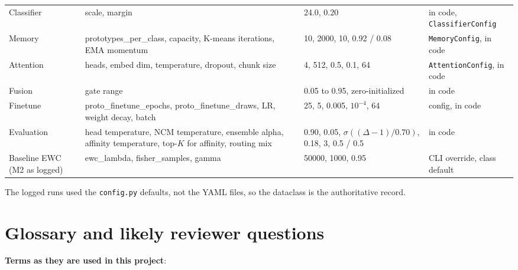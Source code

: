 \documentclass[11pt,a4paper]{article}
\newcommand{\code}[1]{\texttt{#1}}
\begin{document}
\begin{longtable}{L{2cm} L{5.2cm} L{4.4cm} L{3.4cm}}
Classifier & scale, margin & 24.0, 0.20 & in code, \code{ClassifierConfig} \\
Memory & prototypes\_per\_class, capacity, K-means iterations, EMA momentum & 10, 2000, 10, 0.92 / 0.08 & \code{MemoryConfig}, in code \\
Attention & heads, embed dim, temperature, dropout, chunk size & 4, 512, 0.5, 0.1, 64 & \code{AttentionConfig}, in code \\
Fusion & gate range & 0.05 to 0.95, zero-initialized & in code \\
Finetune & proto\_finetune\_epochs, proto\_finetune\_draws, LR, weight decay, batch & 25, 5, 0.005, $10^{-4}$, 64 & config, in code \\
Evaluation & head temperature, NCM temperature, ensemble alpha, affinity temperature, top-$K$ for affinity, routing mix & 0.90, 0.05, $\sigma((\Delta - 1)/0.70)$, 0.18, 3, 0.5 / 0.5 & in code \\
Baseline EWC (M2 as logged) & ewc\_lambda, fisher\_samples, gamma & 50000, 1000, 0.95 & CLI override, class default \\
\end{longtable}

The logged runs used the \code{config.py} defaults, not the YAML files, so the dataclass is the authoritative record.

\section{Glossary and likely reviewer questions}

\textbf{Terms as they are used in this project}:
\end{document}
